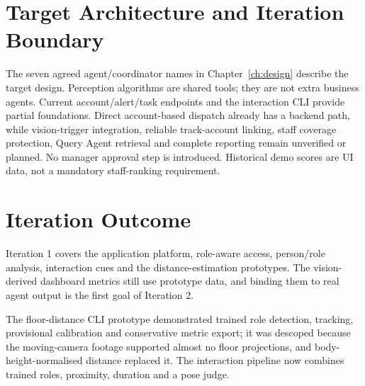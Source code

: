 \section{Target Architecture and Iteration Boundary}
The seven agreed agent/coordinator names in Chapter~\ref{ch:design} describe the target design. Perception algorithms are shared tools; they are not extra business agents. Current account/alert/task endpoints and the interaction CLI provide partial foundations. Direct account-based dispatch already has a backend path, while vision-trigger integration, reliable track-account linking, staff coverage protection, Query Agent retrieval and complete reporting remain unverified or planned. No manager approval step is introduced. Historical demo scores are UI data, not a mandatory staff-ranking requirement.

\section{Iteration Outcome}
Iteration 1 covers the application platform, role-aware access, person/role analysis, interaction cues and the distance-estimation prototypes. The vision-derived dashboard metrics still use prototype data, and binding them to real agent output is the first goal of Iteration 2.

The floor-distance CLI prototype demonstrated trained role detection, tracking, provisional calibration and conservative metric export; it was descoped because the moving-camera footage supported almost no floor projections, and body-height-normalised distance replaced it. The interaction pipeline now combines trained roles, proximity, duration and a pose judge.
